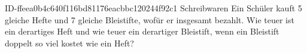 \begin{exercise}
      {ID-ffeea0b4c640f116bd81176eacbbc120244f92c1}
      {Schreibwaren}
  \ifproblem\problem
    Ein Schüler kauft 5 gleiche Hefte und 7 gleiche Bleistifte, wofür er
    insgesamt  bezahlt. Wie teuer ist ein derartiges Heft und wie
    teuer ein derartiger Bleistift, wenn ein Bleistift doppelt so viel kostet
    wie ein Heft?
  \fi
\end{exercise}

